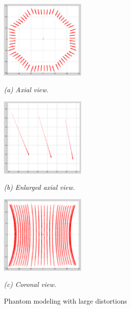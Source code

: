 \begin{figure}[htb]

  \begin{minipage}[b]{1.65in}
    \centering
    \centerline{\mbox{\includegraphics[width=1.65in]{isocenter/images/simulation/axial_distortion_0.eps}}}
    \centerline{\emph{(a) Axial view.}}\medskip
  \end{minipage}
  \hfill
  \begin{minipage}[b]{1.65in}
    \centering
    \centerline{\mbox{\includegraphics[width=1.65in]{isocenter/images/simulation/axial_tube_distortion_0.eps}}}
    \centerline{\emph{(b) Enlarged axial view.}}\medskip
  \end{minipage}
  \hfill
  \begin{minipage}[b]{1.65in}
    \centering
    \centerline{\mbox{\includegraphics[width=1.65in]{isocenter/images/simulation/coronal_distortion_0.eps}}}
    \centerline{\emph{(c) Coronal view.}}\medskip
  \end{minipage}
%
  \caption{Phantom modeling with large distortions}
  \label{fig:2}
%
\end{figure}


